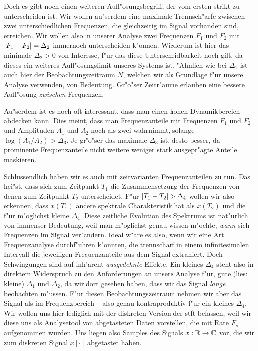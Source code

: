 Doch es gibt noch einen weiteren Aufl"osungsbegriff, der vom ersten strikt zu unterscheiden ist.
Wir wollen au"serdem eine maximale Trennsch"arfe zwischen zwei unterschiedlichen Frequenzen, die gleichzeitig im Signal vorhanden sind, erreichen.
Wir wollen also in unserer Analyse zwei Frequenzen $F_1$ und $F_2$ mit ${\left| F_1 - F_2 \right|} = \Delta_2$ immernoch unterscheiden k"onnen.
Wiederum ist hier das minimale $\Delta_2 > 0$ von Interesse, f"ur das diese Unterscheidbarkeit noch gilt, da dieses ein weiteres Aufl"osungslimit unseres Systems ist.
"Ahnlich wie bei $\Delta_1$ ist auch hier der Beobachtungszeitraum $N$, welchen wir als Grundlage f"ur unsere Analyse verwenden, von Bedeutung. 
Gr"o"ser Zeitr"aume erlauben eine bessere Aufl"osung \emph{zwischen} Frequenzen.

Au"serdem ist es noch oft interessant, dass man einen hohen Dynamikbereich abdecken kann.
Dies meint, dass man Frequenzanteile mit Frequenzen $F_1$ und $F_2$ und Amplituden $A_1$ und $A_2$ noch als zwei wahrnimmt, solange $\log(A_1/A_2) > \Delta_3$. 
Je gr"o"ser das maximale $\Delta_3$ ist, desto besser, da prominente Frequenzanteile nicht weitere weniger stark ausgepr"agte Anteile maskieren.

Schlussendlich haben wir es auch mit zeitvarianten Frequenzanteilen zu tun.
Das hei"st, dass sich zum Zeitpunkt $T_1$ die Zusammensetzung der Frequenzen von denen zum Zeitpunkt $T_2$ unterscheidet.
F"ur ${\left| T_1 - T_2 \right|} > \Delta_4$ wollen wir also erkennen, dass $x(T_1)$ andere spektrale Charakteristik hat als $x(T_2)$ und die f"ur m"oglichst kleine $\Delta_4$.
Diese zeitliche Evolution des Spektrums ist nat"urlich von immenser Bedeutung, weil man m"oglichst genau wissen m"ochte, \emph{wann} sich Frequenzen im Signal ver"andern.
Ideal w"are es also, wenn wir eine Art  Frequenzanalyse durchf"uhren k"onnten, die trennscharf in einem infinitesimalen Intervall die jeweiligen Frequenzanteile aus dem Signal extrahiert.
Doch Schwingungen sind auf inh"arent \emph{ausgedehnte} Effekte.
Ein kleines $\Delta_4$ steht also in direktem Widerspruch zu den Anforderungen an unsere Analyse f"ur, gute (lies: kleine) $\Delta_1$ und $\Delta_2$, da wir dort gesehen haben, dass wir das Signal \emph{lange} beobachten m"ussen.
F"ur diesen Beobachtungszeitraum nehmen wir aber das Signal als  im Frequenzbereich -- also genau kontraproduktiv f"ur ein kleines $\Delta_4$.
%
Wir wollen uns hier lediglich mit der diskreten Version der \gls{stft} befassen, weil wir diese uns als Analysetool von abgetasteten Daten vorstellen, die mit Rate $F_s$ aufgenommen wurden.
Uns liegen also Samples des Signals $x: \mathbb{R} \rightarrow \mathbb{C}$ vor, die wir zum diskreten Signal $x[\cdot]$ abgetastet haben.
%
